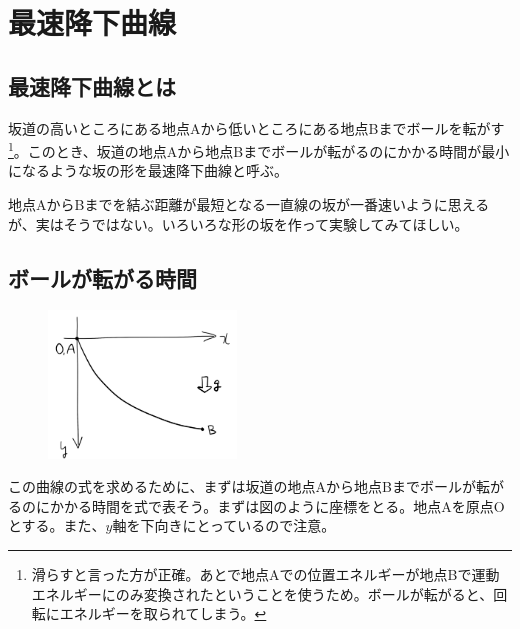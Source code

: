 \section{最速降下曲線}

\subsection{最速降下曲線とは}
坂道の高いところにある地点Aから低いところにある地点Bまでボールを転がす\footnote{滑らすと言った方が正確。あとで地点Aでの位置エネルギーが地点Bで運動エネルギーにのみ変換されたということを使うため。ボールが転がると、回転にエネルギーを取られてしまう。}。このとき、坂道の地点Aから地点Bまでボールが転がるのにかかる時間が最小になるような坂の形を最速降下曲線と呼ぶ。\par
地点AからBまでを結ぶ距離が最短となる一直線の坂が一番速いように思えるが、実はそうではない。いろいろな形の坂を作って実験してみてほしい。

\subsection{ボールが転がる時間}
\begin{figure}
  \centering
  \vspace{-5zw}
  \includegraphics[width = 5cm]{nakayama1/image/zahyou}
\end{figure}
この曲線の式を求めるために、まずは坂道の地点Aから地点Bまでボールが転がるのにかかる時間を式で表そう。まずは図のように座標をとる。地点Aを原点Oとする。また、$y$軸を下向きにとっているので注意。


